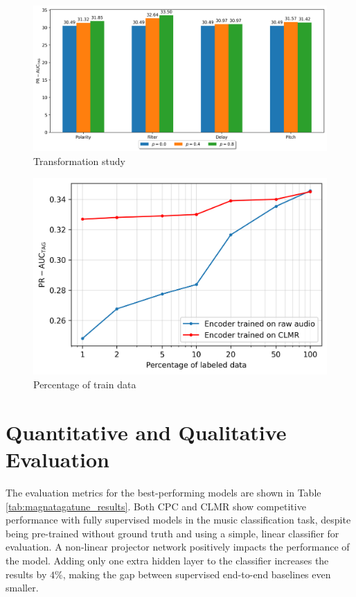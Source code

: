 \begin{figure}[t]
    \centering
    \includegraphics[width=\columnwidth]{figs/transformation_probabilities.png}
    \caption{Transformation study}
    \label{fig:transformation_probabilities}
\end{figure}


\begin{figure}[t]
    \centering
    \includegraphics[width=\columnwidth]{figs/perc_train_data.png}
    \caption{Percentage of train data}
    \label{fig:perc_train_data}
\end{figure}


\section{Quantitative and Qualitative Evaluation}
The evaluation metrics for the best-performing models are shown in Table \ref{tab:magnatagatune_results}.
Both CPC and CLMR show competitive performance with fully supervised models in the music classification task, despite being pre-trained without ground truth and using a simple, linear classifier for evaluation.
A non-linear projector network positively impacts the performance of the model.
Adding only one extra hidden layer to the classifier increases the results by $4\%$, making the gap between supervised end-to-end baselines even smaller.


